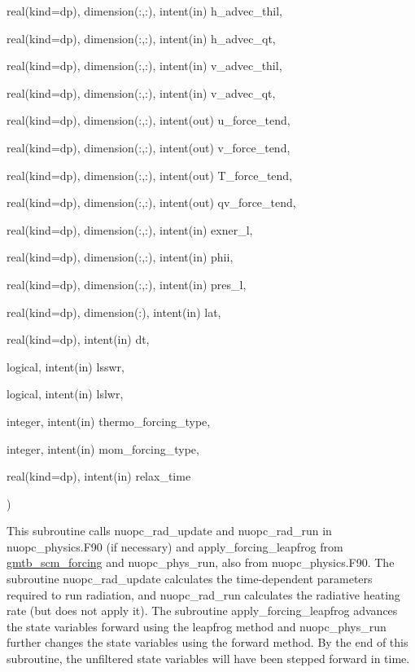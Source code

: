 {\begin{DoxyParamCaption}
\item[{real(kind=dp), dimension(\+:,\+:), intent(in)}]{h\+\_\+advec\+\_\+thil, }
\item[{real(kind=dp), dimension(\+:,\+:), intent(in)}]{h\+\_\+advec\+\_\+qt, }
\item[{real(kind=dp), dimension(\+:,\+:), intent(in)}]{v\+\_\+advec\+\_\+thil, }
\item[{real(kind=dp), dimension(\+:,\+:), intent(in)}]{v\+\_\+advec\+\_\+qt, }
\item[{real(kind=dp), dimension(\+:,\+:), intent(out)}]{u\+\_\+force\+\_\+tend, }
\item[{real(kind=dp), dimension(\+:,\+:), intent(out)}]{v\+\_\+force\+\_\+tend, }
\item[{real(kind=dp), dimension(\+:,\+:), intent(out)}]{T\+\_\+force\+\_\+tend, }
\item[{real(kind=dp), dimension(\+:,\+:), intent(out)}]{qv\+\_\+force\+\_\+tend, }
\item[{real(kind=dp), dimension(\+:,\+:), intent(in)}]{exner\+\_\+l, }
\item[{real(kind=dp), dimension(\+:,\+:), intent(in)}]{phii, }
\item[{real(kind=dp), dimension(\+:,\+:), intent(in)}]{pres\+\_\+l, }
\item[{real(kind=dp), dimension(\+:), intent(in)}]{lat, }
\item[{real(kind=dp), intent(in)}]{dt, }
\item[{logical, intent(in)}]{lsswr, }
\item[{logical, intent(in)}]{lslwr, }
\item[{integer, intent(in)}]{thermo\+\_\+forcing\+\_\+type, }
\item[{integer, intent(in)}]{mom\+\_\+forcing\+\_\+type, }
\item[{real(kind=dp), intent(in)}]{relax\+\_\+time}
\end{DoxyParamCaption}
)}\hypertarget{group__time__integration_ga32b72716e3e970874e9cb909ba66328d}{}\label{group__time__integration_ga32b72716e3e970874e9cb909ba66328d}


This subroutine calls nuopc\+\_\+rad\+\_\+update and nuopc\+\_\+rad\+\_\+run in nuopc\+\_\+physics.\+F90 (if necessary) and apply\+\_\+forcing\+\_\+leapfrog from \hyperlink{group__forcing}{gmtb\+\_\+scm\+\_\+forcing} and nuopc\+\_\+phys\+\_\+run, also from nuopc\+\_\+physics.\+F90. The subroutine nuopc\+\_\+rad\+\_\+update calculates the time-\/dependent parameters required to run radiation, and nuopc\+\_\+rad\+\_\+run calculates the radiative heating rate (but does not apply it). The subroutine apply\+\_\+forcing\+\_\+leapfrog advances the state variables forward using the leapfrog method and nuopc\+\_\+phys\+\_\+run further changes the state variables using the forward method. By the end of this subroutine, the unfiltered state variables will have been stepped forward in time. 


